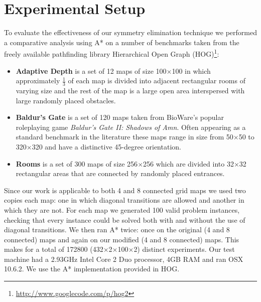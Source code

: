 \section{Experimental Setup}
To evaluate the effectiveness of our symmetry elimination technique we performed
a comparative analysis using A* on a number of benchmarks taken from
the freely available pathfinding library 
Hierarchical Open Graph (HOG)\footnote{\url{http://www.googlecode.com/p/hog2}}:
\begin{itemize}
\item{\textbf{Adaptive Depth} is a set of 12 maps of size 100$\times$100 in which approximately
$\frac{1}{3}$ of each map is divided into adjacent rectangular rooms of
varying size and the rest of the map is a large open area interspersed with 
large randomly placed obstacles.}
\item{\textbf{Baldur's Gate} is a set of 120 maps taken from BioWare's popular
roleplaying game \emph{Baldur's Gate II: Shadows of Amn}. 
Often appearing as a standard benchmark in the literature 
\cite{botea04,bjornsson05,bjornsson06,sturtevant07} these maps range in 
size from 50$\times$50 to 320$\times$320 and have a distinctive 45-degree orientation.}
\item{\textbf{Rooms} is a set of 300 maps of size 256$\times$256 which are divided into 32$\times$32
rectangular areas that are connected by randomly placed entrances.}
\end{itemize}

Since our work is applicable to both 4 and 8 connected grid maps we used two
copies each map: one in which diagonal transitions are allowed and another
in which they are not.
For each map we generated 100 valid problem instances, checking that every
instance could be solved both with and without the use of diagonal
transitions.
We then ran A* twice: once on the original (4 and 8 connected) maps and again 
on our modified (4 and 8 connected) maps. 
This makes for a total of 172800 (432$\times$2$\times$100$\times$2) distinct experiments.
Our test machine had a 2.93GHz Intel Core 2 Duo processor, 4GB RAM and
ran OSX 10.6.2.
We use the A* implementation provided in HOG.
